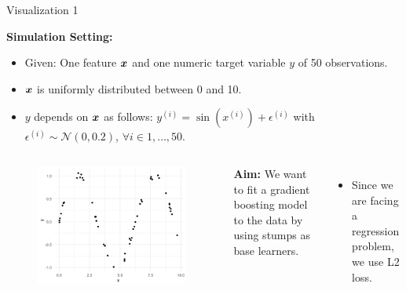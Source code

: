 \begin{vbframe}{Visualization 1}
\begin{footnotesize}
\textbf{Simulation Setting:}
\begin{itemize}
\item Given: One feature $\bm{x}$ and one numeric target variable $y$ of 50 observations.
\item $\bm{x}$ is uniformly distributed between 0 and 10.
\item $y$ depends on $\bm{x}$ as follows: $y^{(i)} = \sin{(x^{(i)})} + \epsilon^{(i)}$ with $\epsilon^{(i)} \sim \mathcal{N}(0,0.2)$, $\forall i \in 1,\dots,50$.
\end{itemize}

\vspace*{0.2cm}

\begin{columns}

\column{5cm}
\begin{figure}
  \includegraphics{figure_man/gbm_anim_data.png}
\end{figure}

\column{5cm}
\textbf{Aim:} We want to fit a gradient boosting model to the data by using stumps as base learners.
\begin{itemize}
\item Since we are facing a regression problem, we use L2 loss.
\end{itemize}



\end{columns}
\end{footnotesize}
\end{vbframe}
